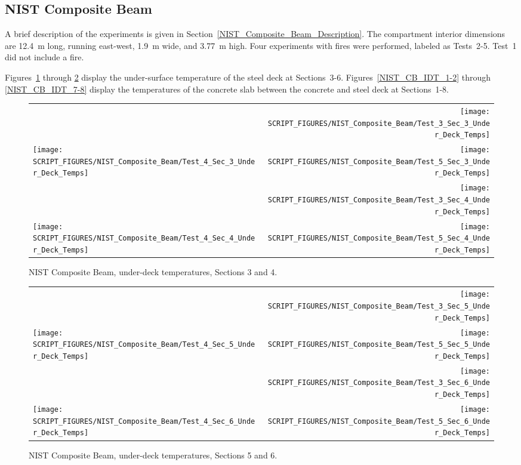 \clearpage

\subsection{NIST Composite Beam}

A brief description of the experiments is given in Section~\ref{NIST_Composite_Beam_Description}. The compartment interior dimensions are 12.4~m long, running east-west, 1.9~m wide, and 3.77~m high. Four experiments with fires were performed, labeled as Tests~2-5. Test~1 did not include a fire.

Figures~\ref{NIST_CB_UDT_3-4} through \ref{NIST_CB_UDT_5-6} display the under-surface temperature of the steel deck at Sections~3-6. Figures~\ref{NIST_CB_IDT_1-2} through \ref{NIST_CB_IDT_7-8} display the temperatures of the concrete slab between the concrete and steel deck at Sections~1-8.

\newpage

\begin{figure}[p]
\begin{tabular*}{\textwidth}{l@{\extracolsep{\fill}}r}
 &
\texttt{[image: SCRIPT\_FIGURES/NIST\_Composite\_Beam/Test\_3\_Sec\_3\_Under\_Deck\_Temps]} \\
\texttt{[image: SCRIPT\_FIGURES/NIST\_Composite\_Beam/Test\_4\_Sec\_3\_Under\_Deck\_Temps]} &
\texttt{[image: SCRIPT\_FIGURES/NIST\_Composite\_Beam/Test\_5\_Sec\_3\_Under\_Deck\_Temps]} \\
 &
\texttt{[image: SCRIPT\_FIGURES/NIST\_Composite\_Beam/Test\_3\_Sec\_4\_Under\_Deck\_Temps]} \\
\texttt{[image: SCRIPT\_FIGURES/NIST\_Composite\_Beam/Test\_4\_Sec\_4\_Under\_Deck\_Temps]} &
\texttt{[image: SCRIPT\_FIGURES/NIST\_Composite\_Beam/Test\_5\_Sec\_4\_Under\_Deck\_Temps]} 
\end{tabular*}
\caption[NIST Composite Beam, under-deck temperatures, Sections 3 and 4]{NIST Composite Beam, under-deck temperatures, Sections 3 and 4.}
\label{NIST_CB_UDT_3-4}
\end{figure}

\begin{figure}[p]
\begin{tabular*}{\textwidth}{l@{\extracolsep{\fill}}r}
 &
\texttt{[image: SCRIPT\_FIGURES/NIST\_Composite\_Beam/Test\_3\_Sec\_5\_Under\_Deck\_Temps]} \\
\texttt{[image: SCRIPT\_FIGURES/NIST\_Composite\_Beam/Test\_4\_Sec\_5\_Under\_Deck\_Temps]} &
\texttt{[image: SCRIPT\_FIGURES/NIST\_Composite\_Beam/Test\_5\_Sec\_5\_Under\_Deck\_Temps]} \\
 &
\texttt{[image: SCRIPT\_FIGURES/NIST\_Composite\_Beam/Test\_3\_Sec\_6\_Under\_Deck\_Temps]} \\
\texttt{[image: SCRIPT\_FIGURES/NIST\_Composite\_Beam/Test\_4\_Sec\_6\_Under\_Deck\_Temps]} &
\texttt{[image: SCRIPT\_FIGURES/NIST\_Composite\_Beam/Test\_5\_Sec\_6\_Under\_Deck\_Temps]}
\end{tabular*}
\caption[NIST Composite Beam, under-deck temperatures, Sections 5 and 6]{NIST Composite Beam, under-deck temperatures, Sections 5 and 6.}
\label{NIST_CB_UDT_5-6}
\end{figure}

